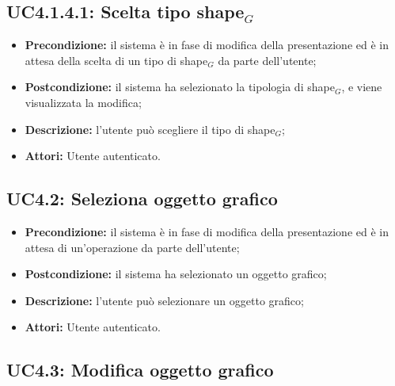 \subsection{ UC4.1.4.1: Scelta tipo shape$_G$}

\begin{itemize}
	\item \textbf{Precondizione:} il sistema è in fase di modifica della presentazione ed è in attesa della scelta di un tipo di shape$_G$ da parte dell'utente;
	\item \textbf{Postcondizione:} il sistema ha selezionato la tipologia di shape$_G$, e viene visualizzata la modifica;
	\item \textbf{Descrizione:} l'utente può scegliere il tipo di shape$_G$;
	\item \textbf{Attori:} Utente autenticato.
\end{itemize}
\subsection{ UC4.2: Seleziona oggetto grafico}

\begin{itemize}
	\item \textbf{Precondizione:} il sistema è in fase di modifica della presentazione ed è in attesa di un'operazione da parte dell'utente;
	\item \textbf{Postcondizione:} il sistema ha selezionato un oggetto grafico;
	\item \textbf{Descrizione:} l'utente può selezionare un oggetto grafico;
	\item \textbf{Attori:} Utente autenticato.
\end{itemize}
\subsection{ UC4.3: Modifica oggetto grafico}

